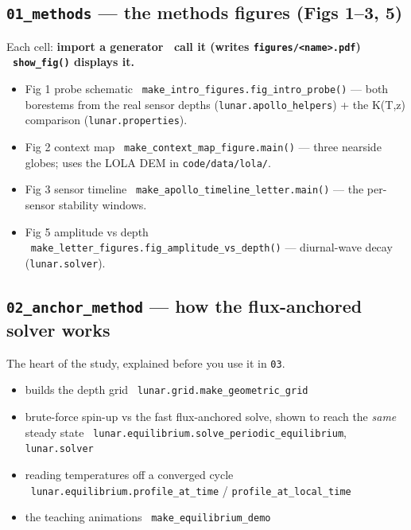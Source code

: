 \documentclass[11pt]{article}
\newcommand{\code}[1]{\texttt{\small #1}}
\newcommand{\fn}[1]{\texttt{\small\color{coral}#1}}
\newcommand{\arr}{\textrightarrow}
\newcommand{\nb}[1]{\texttt{\small\color{forest}#1}}
\begin{document}
\subsection{\nb{01\_methods} --- the methods figures (Figs 1--3, 5)}
Each cell: \textbf{import a generator \arr\ call it (writes \code{figures/<name>.pdf}) \arr\ \code{show\_fig()} displays it.}
\begin{itemize}
\item Fig 1 probe schematic \arr\ \fn{make\_intro\_figures.fig\_intro\_probe()} --- both borestems from the real sensor depths (\code{lunar.apollo\_helpers}) + the K(T,z) comparison (\code{lunar.properties}).
\item Fig 2 context map \arr\ \fn{make\_context\_map\_figure.main()} --- three nearside globes; uses the LOLA DEM in \code{code/data/lola/}.
\item Fig 3 sensor timeline \arr\ \fn{make\_apollo\_timeline\_letter.main()} --- the per-sensor stability windows.
\item Fig 5 amplitude vs depth \arr\ \fn{make\_letter\_figures.fig\_amplitude\_vs\_depth()} --- diurnal-wave decay (\code{lunar.solver}).
\end{itemize}

\subsection{\nb{02\_anchor\_method} --- how the flux-anchored solver works}
The heart of the study, explained before you use it in \nb{03}.
\begin{itemize}
\item builds the depth grid \arr\ \fn{lunar.grid.make\_geometric\_grid}
\item brute-force spin-up vs the fast flux-anchored solve, shown to reach the \emph{same} steady state \arr\ \fn{lunar.equilibrium.solve\_periodic\_equilibrium}, \code{lunar.solver}
\item reading temperatures off a converged cycle \arr\ \fn{lunar.equilibrium.profile\_at\_time} / \code{profile\_at\_local\_time}
\item the teaching animations \arr\ \fn{make\_equilibrium\_demo}
\end{itemize}
\end{document}
